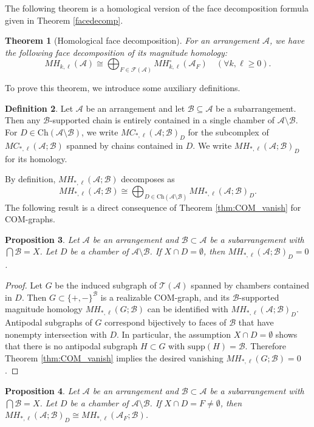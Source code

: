 \documentclass{amsart}
\numberwithin{equation}{section}
\newtheorem{thm}{Theorem}[section]
\newtheorem{prop}[thm]{Proposition}
\theoremstyle{plain}
\theoremstyle{remark}
\theoremstyle{definition}
\newtheorem{defn}[thm]{Definition}
\numberwithin{equation}{section}
\newcommand{\A}{\mathcal{A}}
\newcommand{\B}{\mathcal{B}}
\newcommand{\Ch}{\mathrm{Ch}}
\newcommand{\supp}{\mathrm{supp}}
\begin{document}
The following theorem is a homological version of the face decomposition formula given in Theorem \ref{facedecomp}.

\begin{thm}[Homological face decomposition]\label{facedecompMH}
    For an arrangement $\A$, we have the following face decomposition of its magnitude homology:
    \[
    MH_{k,\ell}(\A)\cong \bigoplus_{F\in \mathcal{F}(\A)}MH^\circ_{k,\ell}(\A_F)\quad (\forall k,\ell\geq 0).
    \]
\end{thm}

To prove this theorem, we introduce some auxiliary definitions.

\begin{defn}
Let $\A$ be an arrangement and let $\B\subseteq \A$ be a subarrangement.
Then any $\B$-supported chain is entirely contained in a single chamber of $\A\setminus \B$.
For $D\in \Ch(\A\setminus\B)$, we write $MC_{*,\ell}(\A;\B)_D$ for the subcomplex of $MC_{*,\ell}(\A;\B)$ spanned by chains contained in $D$.
We write $MH_{*,\ell}(\A;\B)_D$ for its homology.
\end{defn}

By definition, $MH_{*,\ell}(\A;\B)$ decomposes as
\[
MH_{*,\ell}(\A;\B)\cong \bigoplus_{D\in \Ch(\A\setminus\B)}MH_{*,\ell}(\A;\B)_D.
\]
The following result is a direct consequence of Theorem \ref{thm:COM_vanish} for COM-graphs.

\begin{prop}\label{prop:vanishing_arr}
    Let $\A$ be an arrangement and $\B\subset \A$ be a subarrangement with $\bigcap \B=X$.
    Let $D$ be a chamber of $\A\setminus\B$.
    If $X\cap D=\emptyset$, then $MH_{*,\ell}(\A;\B)_D=0$.
\end{prop}

\begin{proof}
    Let $G$ be the induced subgraph of $\mathcal{T}(\A)$ spanned by chambers contained in $D$.
    Then $G\subset \{+,-\}^\B$ is a realizable COM-graph, and its $\B$-supported magnitude homology $MH_{*,\ell}(G;\B)$ can be identified with $MH_{*,\ell}(\A;\B)_D$.
    Antipodal subgraphs of $G$ correspond bijectively to faces of $\B$ that have nonempty intersection with $D$.
    In particular, the assumption $X\cap D=\emptyset$ shows that there is no antipodal subgraph $H\subset G$ with $\supp(H)=\B$.
    Therefore Theorem \ref{thm:COM_vanish} implies the desired vanishing $MH_{*,\ell}(G;\B)=0$.
\end{proof}

\begin{prop}\label{prop:face_localization}
    Let $\A$ be an arrangement and $\B\subset \A$ be a subarrangement with $\bigcap \B=X$.
    Let $D$ be a chamber of $\A\setminus\B$.
    If $X\cap D=F\neq\emptyset$, then $MH_{*,\ell}(\A;\B)_D\cong MH_{*,\ell}(\A_F;\B)$.
\end{prop}
\end{document}
